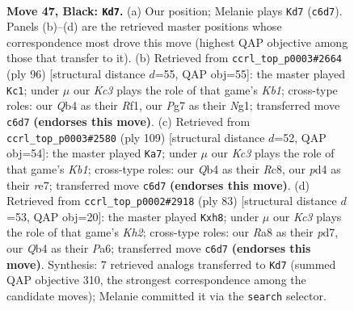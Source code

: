 \documentclass[11pt]{article}
\begin{document}
\clearpage

\begin{figure}[p]\centering
\begin{subfigure}{0.46\textwidth}\centering
\resizebox{\linewidth}{!}{%
\newchessgame
\chessboard[
  setfen={r5r1/p5p1/2k4p/3p3P/pq1P2Pb/4P3/2Q3K1/5N2 b - - 3 47},
  showmover=false,
  pgfstyle=straightmove, color=movearrow, markmove={c6-d7}
]}
\caption{}
\end{subfigure}\hfill
\begin{subfigure}{0.46\textwidth}\centering
\resizebox{\linewidth}{!}{%
\newchessgame
\chessboard[
  setfen={8/p5k1/8/2p3p1/1q1pPnP1/3P4/2P2P2/1K3RNQ w - - 2 49},
  showmover=false,
  pgfstyle=straightmove, color=movearrow, markmove={b1-c1}
]}
\caption{}
\end{subfigure}
\\[4pt]
\begin{subfigure}{0.46\textwidth}\centering
\resizebox{\linewidth}{!}{%
\newchessgame
\chessboard[
  setfen={1kr5/2p1R3/3p3p/1QpP4/2P3q1/P4p2/1P6/1K6 b - - 7 55},
  showmover=false,
  pgfstyle=straightmove, color=movearrow, markmove={b8-a7}
]}
\caption{}
\end{subfigure}\hfill
\begin{subfigure}{0.46\textwidth}\centering
\resizebox{\linewidth}{!}{%
\newchessgame
\chessboard[
  setfen={7Q/3P3k/p4pp1/P7/1pP4p/1P5P/6PK/4rr2 b - - 2 42},
  showmover=false,
  pgfstyle=straightmove, color=movearrow, markmove={h7-h8}
]}
\caption{}
\end{subfigure}
\caption{\textbf{Move 47, Black: \texttt{Kd7}.} (a) Our position; Melanie plays \texttt{Kd7} (\texttt{c6d7}). Panels (b)--(d) are the retrieved master positions whose correspondence most drove this move (highest QAP objective among those that transfer to it). (b) Retrieved from \texttt{ccrl\_top\_p0003\#2664} (ply 96) [structural distance $d$=55, QAP obj=55]: the master played \texttt{Kc1}; under $\mu$ our \emph{Kc3} plays the role of that game's \emph{Kb1}; cross-type roles: our \emph{Q}b4 as their \emph{R}f1, our \emph{P}g7 as their \emph{N}g1; transferred move \texttt{c6d7} \textbf{(endorses this move)}. (c) Retrieved from \texttt{ccrl\_top\_p0003\#2580} (ply 109) [structural distance $d$=52, QAP obj=54]: the master played \texttt{Ka7}; under $\mu$ our \emph{Kc3} plays the role of that game's \emph{Kb1}; cross-type roles: our \emph{Q}b4 as their \emph{R}c8, our \emph{p}d4 as their \emph{r}e7; transferred move \texttt{c6d7} \textbf{(endorses this move)}. (d) Retrieved from \texttt{ccrl\_top\_p0002\#2918} (ply 83) [structural distance $d$=53, QAP obj=20]: the master played \texttt{Kxh8}; under $\mu$ our \emph{Kc3} plays the role of that game's \emph{Kh2}; cross-type roles: our \emph{R}a8 as their \emph{p}d7, our \emph{Q}b4 as their \emph{P}a6; transferred move \texttt{c6d7} \textbf{(endorses this move)}. Synthesis: 7 retrieved analogs transferred to \texttt{Kd7} (summed QAP objective 310, the strongest correspondence among the candidate moves); Melanie committed it via the \texttt{search} selector.}
\label{fig:thought-m93}
\end{figure}
\end{document}
